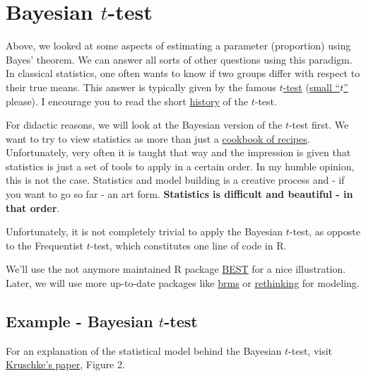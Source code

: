 \documentclass[
]{book}
\begin{document}
\section{\texorpdfstring{Bayesian \(t\)-test}{Bayesian t-test}}\label{bayesian_t_test}

Above, we looked at some aspects of estimating a parameter (proportion) using Bayes' theorem.
We can answer all sorts of other questions using this paradigm. In classical statistics,
one often wants to know if two groups differ with respect to their true means.
This answer is typically given by the famous \href{https://en.wikipedia.org/wiki/Student\%27s_t-test}{\(t\)-test}
(\href{https://pure.manchester.ac.uk/ws/portalfiles/portal/78743532/studentt.pdf}{small ``\(t\)''} please).
I encourage you to read the short \href{https://en.wikipedia.org/wiki/Student\%27s_t-test\#History}{history} of the \(t\)-test.

For didactic reasons, we will look at the Bayesian version of the \(t\)-test first.
We want to try to view statistics as more than just a
\href{https://www.methodenberatung.uzh.ch/de/datenanalyse_spss.html}{cookbook of recipes}.
Unfortunately, very often it is taught that way and the impression is given that statistics is
just a set of tools to apply in a certain order. In my humble opinion, this is not the case. Statistics
and model building is a creative process and - if you want to go so far - an art form.
\textbf{Statistics is difficult and beautiful - in that order}.

Unfortunately, it is not completely trivial to apply the Bayesian \(t\)-test,
as opposte to the Frequentist \(t\)-test,
which constitutes one line of code in R.

We'll use the not anymore maintained R package \href{https://cran.r-project.org/web/packages/BEST/index.html}{BEST}
for a nice illustration. Later, we will use more up-to-date packages like \href{https://cran.r-project.org/web/packages/brms/index.html}{brms}
or \href{https://github.com/rmcelreath/rethinking}{rethinking} for modeling.

\subsection{\texorpdfstring{Example - Bayesian \(t\)-test}{Example - Bayesian t-test}}\label{example---bayesian-t-test}

For an explanation of the statistical model behind the Bayesian \(t\)-test,
visit \href{https://www.krigolsonteaching.com/uploads/4/3/8/4/43848243/kruschke2012jepg.pdf}{Kruschke's paper}, Figure 2.
\end{document}
